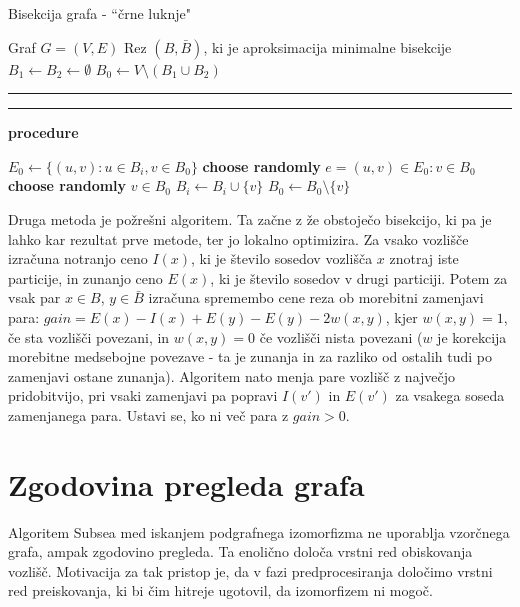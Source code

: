 \documentclass[a4paper, 12pt, ]{book}
\newcommand\Subalg[1]{%
	\Statex%
	\vspace*{-.7\baselineskip}%
	\hspace*{\dimexpr-\algorithmicindent-4pt\relax}%
	\rule{\textwidth}{0.4pt}%
	\Statex%
	
	\vspace*{-.7\baselineskip}%
	\Statex\hspace*{\dimexpr-\algorithmicindent-2pt\relax}%
	\rule{\textwidth}{0.4pt}%
	
	\Statex\hspace*{-\algorithmicindent}\textbf{procedure} #1%
}
\newcommand{\TODO}[1]{\textcolor{red}{#1}}
\begin{document}
\begin{algorithm}
\caption{Bisekcija grafa - ``črne luknje"}
\label{alg:sub_bh}
\begin{algorithmic}[1]
	\Require Graf $G = (V, E)$
	\Ensure Rez $(B, \bar B)$, ki je aproksimacija minimalne bisekcije
	\State $B_1 \gets B_2 \gets \emptyset$
	\State $B_0 \gets V \setminus (B_1 \cup B_2)$
	\Repeat
		\State {}
		\State {}
	
	\Subalg{}

	 \Return \EndIf
	\State $E_0 \gets \{ (u,v): u \in B_i, v \in B_0 \}$
		\State \textbf{choose randomly} $e = (u,v) \in E_0: v \in B_0$
	\Else
		\State \textbf{choose randomly} $v \in B_0$
	\EndIf
	\State $B_i \gets B_i \cup \{ v \}$
	\State $B_0 \gets B_0 \setminus \{ v \}$
\end{algorithmic}
\end{algorithm}

	Druga metoda je požrešni algoritem. Ta začne z že obstoječo bisekcijo, ki pa je lahko kar rezultat prve metode, ter jo lokalno optimizira. Za vsako vozlišče
	izračuna notranjo ceno $I(x)$, ki je število sosedov vozlišča $x$ znotraj iste particije, in zunanjo ceno $E(x)$, ki je število sosedov v drugi particiji. Potem
	za vsak par $x \in B$, $y \in \bar B$ izračuna spremembo cene reza ob morebitni zamenjavi para: $gain = E(x) - I(x) + E(y)  - E(y) - 2w(x,y)$, kjer
	$w(x,y) = 1$, če sta vozlišči povezani, in $w(x,y) = 0$ če vozlišči nista povezani ($w$ je korekcija morebitne medsebojne povezave - ta je zunanja in za
	razliko od ostalih tudi po zamenjavi ostane zunanja). Algoritem nato menja pare vozlišč z največjo pridobitvijo, pri vsaki zamenjavi pa popravi $I(v')$ 
	in $E(v')$ za vsakega soseda zamenjanega para. Ustavi se, ko ni več para z $gain > 0$.
	
	
	
	\section{Zgodovina pregleda grafa}
	\label{sub:th}
	Algoritem Subsea med iskanjem podgrafnega izomorfizma ne uporablja vzorčnega grafa, ampak zgodovino pregleda. Ta enolično določa vrstni red
	obiskovanja vozlišč. Motivacija za tak pristop je, da v fazi predprocesiranja določimo vrstni red preiskovanja, ki bi čim hitreje ugotovil, da izomorfizem
	ni mogoč.
	
\end{document}
